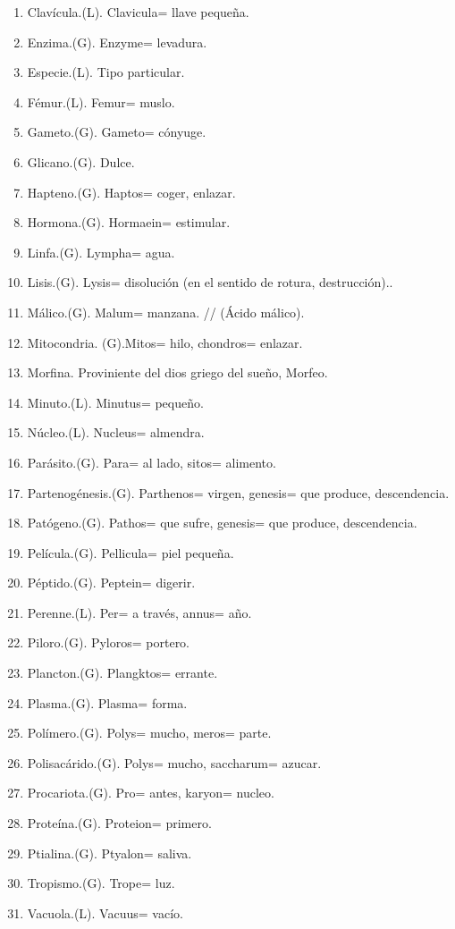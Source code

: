 \documentclass{mylib/reporte}
\begin{document}
\begin{enumerate}
	\item Clavícula.(L). Clavicula= llave pequeña.
	\item Enzima.(G). Enzyme= levadura.
	\item Especie.(L). Tipo particular.
	\item Fémur.(L).  Femur= muslo.
	\item Gameto.(G). Gameto= cónyuge.
	\item Glicano.(G). Dulce.
	\item Hapteno.(G). Haptos= coger, enlazar.
	\item Hormona.(G). Hormaein= estimular.
	\item Linfa.(G). Lympha= agua.
	\item Lisis.(G). Lysis= disolución (en el sentido de rotura, destrucción)..
	\item Málico.(G). Malum= manzana. // (Ácido málico).
	\item Mitocondria. (G).Mitos= hilo, chondros= enlazar.
	\item Morfina. Proviniente del dios griego del sueño, Morfeo.
	\item Minuto.(L). Minutus= pequeño.
	\item Núcleo.(L). Nucleus= almendra.
	\item Parásito.(G). Para= al lado, sitos= alimento.
	\item Partenogénesis.(G). Parthenos= virgen, genesis=  que produce, descendencia.
	\item Patógeno.(G). Pathos= que sufre, genesis=  que produce, descendencia.
	\item Película.(G). Pellicula= piel pequeña.
	\item Péptido.(G). Peptein= digerir.
	\item Perenne.(L). Per= a través, annus= año.
	\item Piloro.(G). Pyloros= portero.
	\item Plancton.(G). Plangktos= errante.
	\item Plasma.(G). Plasma= forma.
	\item Polímero.(G). Polys= mucho, meros= parte.
	\item Polisacárido.(G). Polys= mucho, saccharum= azucar.
	\item Procariota.(G). Pro= antes, karyon= nucleo.
	\item Proteína.(G). Proteion= primero.
	\item Ptialina.(G). Ptyalon= saliva.
	\item Tropismo.(G). Trope= luz.
	\item Vacuola.(L). Vacuus= vacío.

\end{enumerate}
\end{document}

